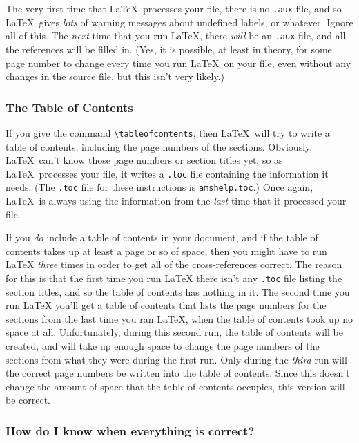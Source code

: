 The very first time that \LaTeX\ processes your file, there is no
\verb".aux" file, and so \LaTeX\ gives {\em lots\/} of warning
messages about undefined labels, or whatever.  Ignore all of this.
The {\em next\/} time that you run \LaTeX, there {\em will\/} be an
\verb".aux" file, and all the references will be filled in.  (Yes, it
is possible, at least in theory, for some page number to change
every time you run \LaTeX\ on your file, even without any
changes in the source file, but this isn't very likely.)

\subsubsection*{The Table of Contents}

If you give the command \verb"\tableofcontents", then \LaTeX\ will
try to write a table of contents, including the page numbers of the
sections.  Obviously, \LaTeX\ can't know those page numbers or
section titles yet, so as \LaTeX\ processes your file, it writes a
\verb".toc" file containing the information it needs.  (The
\verb".toc" file for these instructions is \verb"amshelp.toc".)
Once again, \LaTeX\ is always using the information from the {\em
last\/} time that it processed your file.

If you {\em do\/} include a table of contents in your document, and
if the table of contents takes up at least a page or so of space,
then you might have to run \LaTeX{} {\em three\/} times in order to
get all of the cross-references correct.  The reason for this is that
the first time you run \LaTeX{} there isn't any \verb".toc" file
listing the section titles, and so the table of contents has nothing
in it.  The second time you run \LaTeX{} you'll get a table of
contents that lists the page numbers for the sections from the last
time you ran \LaTeX, when the table of contents took up no space at
all.  Unfortunately, during this second run, the table of contents
will be created, and will take up enough space to change the page
numbers of the sections from what they were during the first run.
Only during the {\em third\/} run will the correct page numbers be
written into the table of contents.  Since this doesn't change the
amount of space that the table of contents occupies, this version
will be correct.

\subsubsection*{How do I know when everything is correct?}

